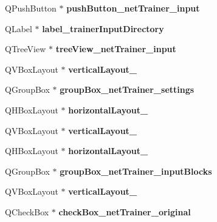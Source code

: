 \begin{DoxyCompactItemize}
Q\+Push\+Button $\ast$ {\bfseries push\+Button\+\_\+net\+Trainer\+\_\+input}
\item 
\mbox{\label{class_ui___main_window_a79b8ee26be51ec88eea8e2ef61501ba7}} 
Q\+Label $\ast$ {\bfseries label\+\_\+trainer\+Input\+Directory}
\item 
\mbox{\label{class_ui___main_window_ab6af4156a5f55a0b6d0818963817f178}} 
Q\+Tree\+View $\ast$ {\bfseries tree\+View\+\_\+net\+Trainer\+\_\+input}
\item 
\mbox{\label{class_ui___main_window_a078f928b999dd0b6e4a697e8c3f71985}} 
Q\+V\+Box\+Layout $\ast$ {\bfseries vertical\+Layout\+\_}
\item 
\mbox{\label{class_ui___main_window_aadb479c76bb101b3ab201859bc096300}} 
Q\+Group\+Box $\ast$ {\bfseries group\+Box\+\_\+net\+Trainer\+\_\+settings}
\item 
\mbox{\label{class_ui___main_window_a3108a1ef2a35dd9b3a9ca4201c791bfa}} 
Q\+H\+Box\+Layout $\ast$ {\bfseries horizontal\+Layout\+\_}
\item 
\mbox{\label{class_ui___main_window_af5441665eed377ebf85e129aa3e2e4a5}} 
Q\+V\+Box\+Layout $\ast$ {\bfseries vertical\+Layout\+\_}
\item 
\mbox{\label{class_ui___main_window_a56a1b7fb92f24086e7f3f00ba647236c}} 
Q\+H\+Box\+Layout $\ast$ {\bfseries horizontal\+Layout\+\_}
\item 
\mbox{\label{class_ui___main_window_a9619b9ddc8a6d2eb67b6c2a01a9af660}} 
Q\+Group\+Box $\ast$ {\bfseries group\+Box\+\_\+net\+Trainer\+\_\+input\+Blocks}
\item 
\mbox{\label{class_ui___main_window_a45a1fe3ab2eb20f88e396075d5ed35f6}} 
Q\+V\+Box\+Layout $\ast$ {\bfseries vertical\+Layout\+\_}
\item 
\mbox{\label{class_ui___main_window_ab1ae04e90e875741534f8955602e5a0e}} 
Q\+Check\+Box $\ast$ {\bfseries check\+Box\+\_\+net\+Trainer\+\_\+original}

\end{DoxyCompactItemize}
